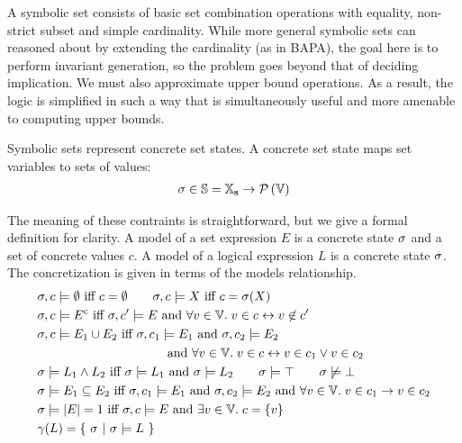A symbolic set consists of basic set combination operations with equality, non-strict subset and simple cardinality.  While more general symbolic sets can reasoned about by extending the cardinality (as in BAPA), the goal here is to perform invariant generation, so the problem goes beyond that of deciding implication.  We must also approximate upper bound operations.  As a result, the logic is simplified in such a way that is simultaneously useful and more amenable to computing upper bounds.

Symbolic sets represent concrete set states.  A concrete set state maps set variables to sets of values:
\begin{align*}
    \sigma \in \mathbb{S} = \mathbb{X}_{\bf s} \rightarrow \mathcal{P}\left({\mathbb{V}}\right)
\end{align*}

The meaning of these contraints is straightforward, but we give a formal definition for clarity.  A model of a set expression $E$ is a concrete state $\sigma$ and a set of concrete values $c$.  A model of a logical expression $L$ is a concrete state $\sigma$.  The concretization is given in terms of the models relationship.
\begin{align*}
  & \sigma, c \models \emptyset \textrm{ iff } c = \emptyset \qquad \sigma, c \models X \textrm{ iff } c = \sigma(X) \\
  & \sigma, c \models {E}^{\mathrm{c}} \textrm{ iff } \sigma, c' \models{E} \textrm{ and } \forall v \in \mathbb{V}. \; v \in c \leftrightarrow v \not\in c' \\
  & \sigma, c \models E_1 \cup E_2 \textrm{ iff } \sigma, c_1 \models E_1 \textrm{ and } \sigma, c_2 \models E_2\\
  & \qquad \qquad \qquad \qquad \qquad  \textrm{ and } \forall v \in \mathbb{V}. \; v \in c \leftrightarrow v \in c_1 \vee v \in c_2 \\
  & \sigma \models L_1 \wedge L_2 \textrm{ iff } \sigma \models L_1 \textrm{ and } \sigma \models L_2 \qquad \sigma \models \top \qquad \sigma \not\models \bot \\
  & \sigma \models E_1 \subseteq E_2 \textrm{ iff } \sigma, c_1 \models E_1 \textrm{ and } \sigma, c_2 \models E_2 \textrm{ and } \forall v \in \mathbb{V}. \; v \in c_1 \rightarrow v \in c_2 \\
  & \sigma \models |{E}| = 1 \textrm{ iff } \sigma, c \models E \textrm{ and } \exists v \in \mathbb{V}. \; c = \{v\} \\
  & \gamma(L) = \{\ \sigma \ |\  \sigma \models L\ \}
\end{align*}

